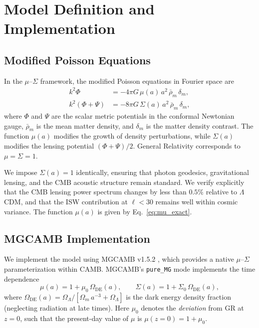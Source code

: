 \documentclass[11pt]{article}
\begin{document}
\section{Model Definition and Implementation}
\label{sec:model}

\subsection{Modified Poisson Equations}

In the $\mu$--$\Sigma$ framework, the modified Poisson equations in Fourier space are
\begin{align}
k^2 \Phi &= -4\pi G\,\mu(a)\,a^2\,\bar{\rho}_m\,\delta_m, \label{eq:poisson_phi} \\
k^2 (\Phi + \Psi) &= -8\pi G\,\Sigma(a)\,a^2\,\bar{\rho}_m\,\delta_m, \label{eq:poisson_phipsi}
\end{align}
where $\Phi$ and $\Psi$ are the scalar metric potentials in the conformal Newtonian gauge, $\bar{\rho}_m$ is the mean matter density, and $\delta_m$ is the matter density contrast.
The function $\mu(a)$ modifies the growth of density perturbations, while $\Sigma(a)$ modifies the lensing potential $(\Phi + \Psi)/2$.
General Relativity corresponds to $\mu = \Sigma = 1$.

We impose $\Sigma(a) = 1$ identically, ensuring that photon geodesics, gravitational lensing, and the CMB acoustic structure remain standard.
We verify explicitly that the CMB lensing power spectrum changes by less than $0.5\%$ relative to $\Lambda$CDM, and that the ISW contribution at $\ell < 30$ remains well within cosmic variance.
The function $\mu(a)$ is given by Eq.~\eqref{eq:mu_exact}.

\subsection{MGCAMB Implementation}
\label{sec:mgcamb}

We implement the model using MGCAMB v1.5.2 \citep{MGCAMB}, which provides a native $\mu$--$\Sigma$ parameterization within CAMB.
MGCAMB's \texttt{pure\_MG} mode implements the time dependence
\begin{equation}
\mu(a) = 1 + \mu_0\,\Omega_\mathrm{DE}(a), \qquad \Sigma(a) = 1 + \Sigma_0\,\Omega_\mathrm{DE}(a),
\label{eq:mgcamb_param}
\end{equation}
where $\Omega_\mathrm{DE}(a) = \Omega_\Lambda / [\Omega_m\,a^{-3} + \Omega_\Lambda]$ is the dark energy density fraction (neglecting radiation at late times).
Here $\mu_0$ denotes the \emph{deviation} from GR at $z = 0$, such that the present-day value of $\mu$ is $\mu(z{=}0) = 1 + \mu_0$.
\end{document}
